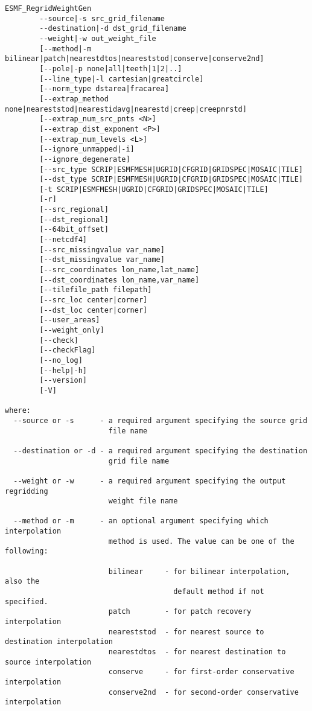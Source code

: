 \begin{verbatim}
ESMF_RegridWeightGen  
        --source|-s src_grid_filename
        --destination|-d dst_grid_filename
        --weight|-w out_weight_file
        [--method|-m bilinear|patch|nearestdtos|neareststod|conserve|conserve2nd]
        [--pole|-p none|all|teeth|1|2|..]
        [--line_type|-l cartesian|greatcircle]
        [--norm_type dstarea|fracarea]
        [--extrap_method none|neareststod|nearestidavg|nearestd|creep|creepnrstd]
        [--extrap_num_src_pnts <N>]
        [--extrap_dist_exponent <P>]
        [--extrap_num_levels <L>]
        [--ignore_unmapped|-i]
        [--ignore_degenerate]
        [--src_type SCRIP|ESMFMESH|UGRID|CFGRID|GRIDSPEC|MOSAIC|TILE]
        [--dst_type SCRIP|ESMFMESH|UGRID|CFGRID|GRIDSPEC|MOSAIC|TILE]
        [-t SCRIP|ESMFMESH|UGRID|CFGRID|GRIDSPEC|MOSAIC|TILE]
        [-r]
        [--src_regional]
        [--dst_regional]
        [--64bit_offset]
        [--netcdf4]
        [--src_missingvalue var_name]
        [--dst_missingvalue var_name]
        [--src_coordinates lon_name,lat_name]
        [--dst_coordinates lon_name,var_name]
        [--tilefile_path filepath]
        [--src_loc center|corner]
        [--dst_loc center|corner]
        [--user_areas]
        [--weight_only]
        [--check]
        [--checkFlag]
        [--no_log]
        [--help|-h]
        [--version]
        [-V]

where:
  --source or -s      - a required argument specifying the source grid
                        file name

  --destination or -d - a required argument specifying the destination
                        grid file name

  --weight or -w      - a required argument specifying the output regridding
                        weight file name

  --method or -m      - an optional argument specifying which interpolation
                        method is used. The value can be one of the following:

                        bilinear     - for bilinear interpolation, also the
                                       default method if not specified.
                        patch        - for patch recovery interpolation
                        neareststod  - for nearest source to destination interpolation
                        nearestdtos  - for nearest destination to source interpolation
                        conserve     - for first-order conservative interpolation
                        conserve2nd  - for second-order conservative interpolation


\end{verbatim}
